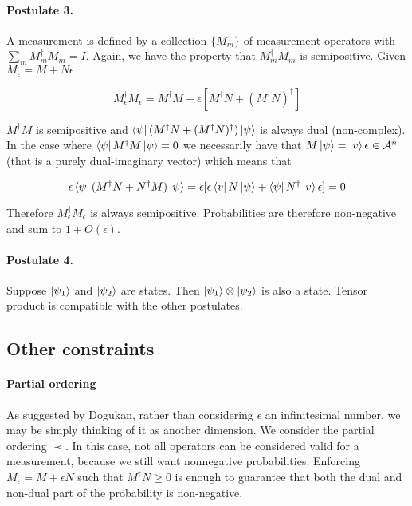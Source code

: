\documentclass{article}
\newcommand{\A}{\mathcal{A}}
\newcommand{\e}{\epsilon}
\begin{document}
\paragraph{Postulate 3.} A measurement is defined by a collection $\{M_m\}$ of measurement operators with $\sum_m M_m^\dagger M_m = I$. Again, we have the property that $M_m^\dagger M_m$ is semipositive. Given $M_{\e} = M + N \e$

\begin{equation}
M_{\e}^\dagger M_{\e} = M^\dagger M + \e[M^\dagger N + (M^\dagger N)^\dagger]
\end{equation}

$M^\dagger M$ is semipositive and $\bra{\psi} (M^\dagger N + (M^\dagger N)^\dagger) \ket{\psi}$ is always dual (non-complex). In the case where $\bra{\psi} M^\dagger M \ket{\psi} = 0$ we necessarily have that $M \ket{\psi} = \ket{v} \e \in \A^n$ (that is a purely dual-imaginary vector) which means that

\begin{equation}
\e \bra{\psi} (M^\dagger N + N^\dagger M) \ket{\psi} = \e [\e \bra{v} N \ket{\psi} + \bra{\psi} N^\dagger \ket{v} \e] = 0
\end{equation}

Therefore $M_{\e}^\dagger M_{\e}$ is always semipositive. Probabilities are therefore non-negative and sum to $1 + O(\e)$.

\paragraph{Postulate 4.} Suppose $\ket{\psi_1}$ and $\ket{\psi_2}$ are states. Then $\ket{\psi_1} \otimes \ket{\psi_2}$ is also a state. Tensor product is compatible with the other postulates.

\subsection{Other constraints}

\paragraph{Partial ordering} As suggested by Dogukan, rather than considering $\e$ an infinitesimal number, we may be simply thinking of it as another dimension. We consider the partial ordering $\prec$. In this case, not all operators can be considered valid for a measurement, because we still want nonnegative probabilities. Enforcing $M_{\e} = M + \e N$ such that $M^\dagger N \geq 0$ is enough to guarantee that both the dual and non-dual part of the probability is non-negative.
\end{document}
